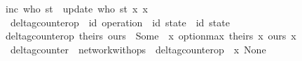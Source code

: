 \begin{isabellebody}
{\isachardoublequoteopen}inc\ who\ st\ {\isacharequal}\ update\ who\ st\ {\isacharparenleft}{\isasymlambda}x{\isachardot}\ x\ {\isacharplus}\ {}{\isacharparenright}{\isachardoublequoteclose}\isanewline
\isanewline
{}\isamarkupfalse%
\ delta{\isacharunderscore}gcounter{\isacharunderscore}op\ {\isacharcolon}{\isacharcolon}\ {\isachardoublequoteopen}{\isacharparenleft}{\isacharprime}id\ operation{\isacharparenright}\ {\isasymRightarrow}\ {\isacharparenleft}{\isacharprime}id\ state{\isacharparenright}\ {\isasymrightharpoonup}\ {\isacharparenleft}{\isacharprime}id\ state{\isacharparenright}{\isachardoublequoteclose}\ \isanewline
{\isachardoublequoteopen}delta{\isacharunderscore}gcounter{\isacharunderscore}op\ theirs\ ours\ {\isacharequal}\ Some\ {\isacharparenleft}{\isasymlambda}\ x{\isachardot}\ option{\isacharunderscore}max\ {\isacharparenleft}theirs\ x{\isacharparenright}\ {\isacharparenleft}ours\ x{\isacharparenright}{\isacharparenright}{\isachardoublequoteclose}\isanewline
\isanewline
{}\isamarkupfalse%
\ delta{\isacharunderscore}gcounter\ {\isacharequal}\ network{\isacharunderscore}with{\isacharunderscore}ops\ {\isacharunderscore}\ delta{\isacharunderscore}gcounter{\isacharunderscore}op\ {\isachardoublequoteopen}{\isasymlambda}\ x{\isachardot}\ None{\isachardoublequoteclose}\isanewline
\end{isabellebody}
